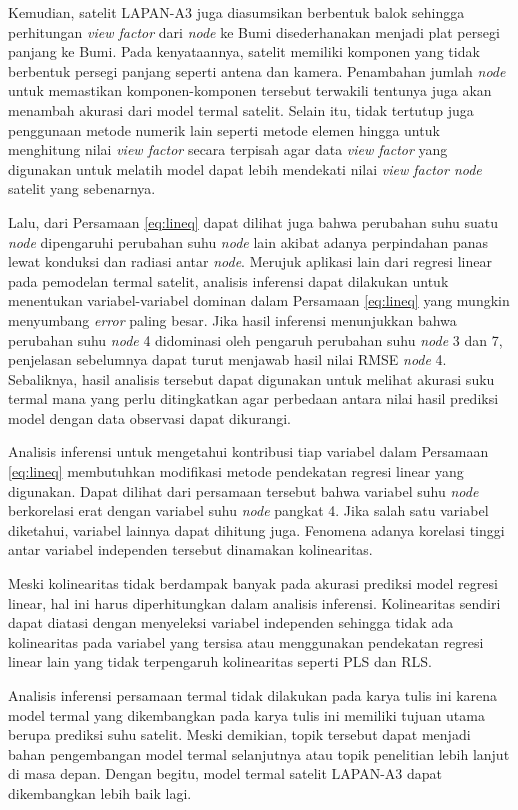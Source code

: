 Kemudian, satelit LAPAN-A3 juga diasumsikan berbentuk balok sehingga
perhitungan \textit{view factor} dari \textit{node} ke Bumi disederhanakan
menjadi plat persegi panjang ke Bumi. Pada kenyataannya, satelit memiliki
komponen yang tidak berbentuk persegi panjang seperti antena dan kamera.
Penambahan jumlah \textit{node} untuk memastikan komponen-komponen tersebut
terwakili tentunya juga akan menambah akurasi dari model termal satelit. Selain
itu, tidak tertutup juga penggunaan metode numerik lain seperti metode elemen
hingga untuk menghitung nilai \textit{view factor} secara terpisah agar data
\textit{view factor} yang digunakan untuk melatih model dapat lebih mendekati
nilai \textit{view factor node} satelit yang sebenarnya.

Lalu, dari Persamaan \ref{eq:lineq} dapat dilihat juga bahwa perubahan suhu
suatu \textit{node} dipengaruhi perubahan suhu \textit{node} lain akibat adanya
perpindahan panas lewat konduksi dan radiasi antar \textit{node}. Merujuk
aplikasi lain dari regresi linear pada pemodelan termal satelit, analisis
inferensi dapat dilakukan untuk menentukan variabel-variabel dominan dalam
Persamaan \ref{eq:lineq} yang mungkin menyumbang \textit{error} paling besar.
Jika hasil inferensi menunjukkan bahwa perubahan suhu \textit{node} 4
didominasi oleh pengaruh perubahan suhu \textit{node} 3 dan 7, penjelasan
sebelumnya dapat turut menjawab hasil nilai RMSE \textit{node} 4. Sebaliknya,
hasil analisis tersebut dapat digunakan untuk melihat akurasi suku termal mana
yang perlu ditingkatkan agar perbedaan antara nilai hasil prediksi model dengan
data observasi dapat dikurangi.

Analisis inferensi untuk mengetahui kontribusi tiap variabel dalam Persamaan
\ref{eq:lineq} membutuhkan modifikasi metode pendekatan regresi linear yang
digunakan. Dapat dilihat dari persamaan tersebut bahwa variabel suhu
\textit{node} berkorelasi erat dengan variabel suhu \textit{node} pangkat 4.
Jika salah satu variabel diketahui, variabel lainnya dapat dihitung juga.
Fenomena adanya korelasi tinggi antar variabel independen tersebut dinamakan
kolinearitas. 

Meski kolinearitas tidak berdampak banyak pada akurasi prediksi model
regresi linear, hal ini harus diperhitungkan dalam analisis inferensi.
Kolinearitas sendiri dapat diatasi dengan menyeleksi variabel
independen sehingga tidak ada kolinearitas pada variabel yang tersisa
atau menggunakan pendekatan regresi linear lain yang tidak terpengaruh
kolinearitas seperti PLS dan RLS.

Analisis inferensi persamaan termal tidak dilakukan pada karya tulis ini karena
model termal yang dikembangkan pada karya tulis ini memiliki tujuan utama
berupa prediksi suhu satelit. Meski demikian, topik tersebut dapat menjadi
bahan pengembangan model termal selanjutnya atau topik penelitian lebih lanjut
di masa depan. Dengan begitu, model termal satelit LAPAN-A3 dapat dikembangkan
lebih baik lagi.
